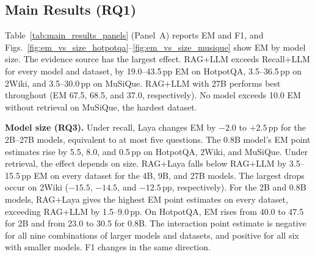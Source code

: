 
\subsection{Main Results (RQ1)}
\label{sec:exp:main}

\begin{figure}[t]
  \hfill
  \hfill
\end{figure}

Table~\ref{tab:main_results_panels} (Panel~A) reports EM and F1, and
Figs.~\ref{fig:em_vs_size_hotpotqa}--\ref{fig:em_vs_size_musique} show EM by model
size. The evidence source has the largest effect. RAG+LLM exceeds Recall+LLM for every
model and dataset, by 19.0--43.5\,pp EM on HotpotQA, 3.5--36.5\,pp on 2Wiki, and
3.5--30.0\,pp on MuSiQue. RAG+LLM with 27B performs best throughout (EM 67.5, 68.5,
and 37.0, respectively). No model exceeds 10.0 EM without retrieval on MuSiQue, the
hardest dataset.


\textbf{Model size (RQ3).} Under recall, Laya changes EM by $-2.0$ to $+2.5$\,pp for
the 2B--27B models, equivalent to at most five questions. The 0.8B model's EM point
estimates rise by 5.5, 8.0, and 0.5\,pp on HotpotQA, 2Wiki, and MuSiQue. Under
retrieval, the effect depends on size. RAG+Laya falls below RAG+LLM
by 3.5--15.5\,pp EM on every dataset for the 4B, 9B, and 27B models. The largest
drops occur on 2Wiki ($-15.5$, $-14.5$, and $-12.5$\,pp, respectively). For the 2B
and 0.8B models, RAG+Laya gives the highest EM point estimates on every dataset,
exceeding RAG+LLM by 1.5--9.0\,pp. On HotpotQA, EM rises from 40.0 to 47.5 for 2B
and from 23.0 to 30.5 for 0.8B. The interaction point estimate is negative for all nine
combinations of larger models and datasets, and positive for all six with smaller
models. F1 changes in the same direction.

